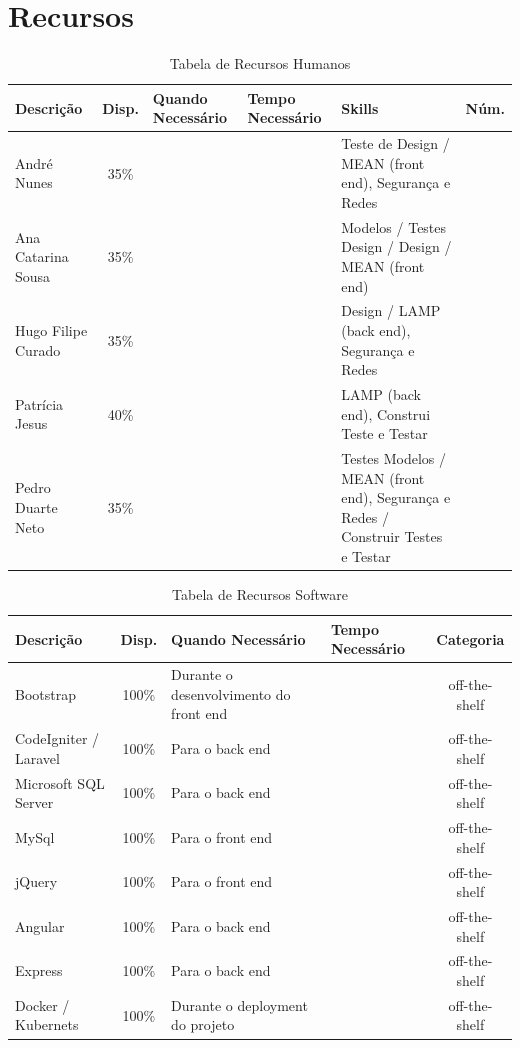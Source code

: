 \documentclass[a4paper]{report}
\begin{document}
\section{Recursos}
\begin{table}[h]
\centering
\begin{tabularx}{\textwidth}{X|c|X|X|X|c}
\textbf{Descrição} & \textbf{Disp.} & \textbf{Quando Necessário} & \textbf{Tempo Necessário} & \textbf{Skills} & \textbf{Núm.} \\ \hline
André Nunes & 35\% &  &  & Teste de Design / MEAN (front end), Segurança e Redes &  \\ \hline
Ana Catarina Sousa & 35\% &  &  & Modelos / Testes Design / Design / MEAN (front end) &  \\ \hline
Hugo Filipe Curado & 35\% &  &  & Design / LAMP (back end), Segurança e Redes &  \\ \hline
Patrícia Jesus & 40\% &  &  & LAMP (back end), Construi Teste e Testar &  \\ \hline
Pedro Duarte Neto & 35\% &  &  & Testes Modelos / MEAN (front end), Segurança e Redes / Construir Testes e Testar &  \\
\end{tabularx}
\caption{Tabela de Recursos Humanos}
\label{TabRH}
\end{table}
\begin{table}[h]
\centering
\begin{tabularx}{\textwidth}{X|c|X|X|c}
\textbf{Descrição} & \textbf{Disp.} & \textbf{Quando Necessário} & \textbf{Tempo Necessário} & \textbf{Categoria} \\ \hline
Bootstrap & \multicolumn{1}{c|}{100\%} & Durante o desenvolvimento do front end &  & off-the-shelf \\ \hline
CodeIgniter / Laravel & 100\% & Para o back end &  & off-the-shelf \\ \hline
Microsoft SQL Server & \multicolumn{1}{c|}{100\%} & Para o back end &  & off-the-shelf \\ \hline
MySql & 100\% & Para o front end &  & off-the-shelf \\ \hline
jQuery & 100\% & Para o front end &  & off-the-shelf \\ \hline
Angular & 100\% & Para o back end &  & off-the-shelf \\ \hline
Express & 100\% & Para o back end &  & off-the-shelf \\ \hline
Docker / Kubernets & \multicolumn{1}{c|}{100\%} & Durante o deployment do projeto &  & off-the-shelf \\
\end{tabularx}
\caption{Tabela de Recursos Software}
\label{TabRS}
\end{table}
\end{document}

